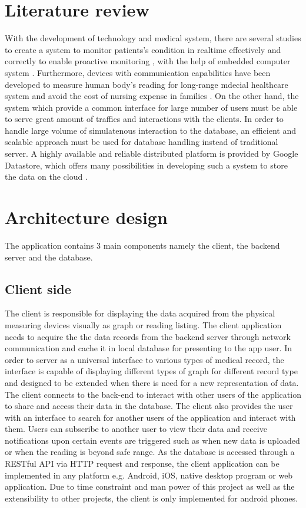 \section{Literature review}
With the development of technology and medical system, there are several studies to create a system to monitor
patients's condition in realtime effectively and correctly to enable proactive monitoring \cite{5076774}, with the help
of embedded computer system \cite{4062461}. Furthermore, devices with communication capabilities have been developed to
measure human body's reading for long-range mdecial healthcare system and avoid the cost of nursing expense in families
\cite{5918041}. On the other hand, the system which provide a common interface for large number of users must be able to
serve great amount of traffics and interactions with the clients.  In order to handle large volume of simulatenous
interaction to the database, an efficient and scalable approach must be used for database handling instead of
traditional server. A highly available and reliable distributed platform is provided by Google Datastore, which offers
many possibilities in developing such a system to store the data on the cloud \cite{7059154}.

\section{Architecture design}
\label{sec:Architecture design}
The application contains 3 main components namely the client, the backend server and the database.

\subsection{Client side}
The client is responsible for displaying the data acquired from the physical measuring devices visually as graph or
reading listing. The client application needs to acquire the the data records from the backend server through network
communication and cache it in local database for presenting to the app user. In order to server as a universal interface to
various types of medical record, the interface is capable of displaying different types of graph for different record
type and designed to be extended when there is need for a new representation of data. The client connects 
to the back-end to interact with other users of the application to share and access their data in the database. The
client also provides the user with an interface to search for another users of the application and interact with them.
Users can subscribe to another user to view their data and receive notifications upon certain events are triggered such
as when new data is uploaded or when the reading is beyond safe range. As the database is accessed through a RESTful API
via HTTP request and response, the client application can be implemented in any platform e.g. Android, iOS, native
desktop program or web application. Due to time constraint and man power of this project as well as the extensibility to
other projects, the client is only implemented for android phones.

